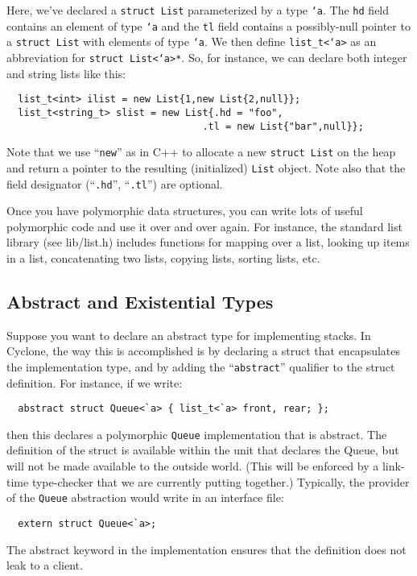 Here, we've declared a \texttt{struct List} parameterized by a type
\texttt{`a}.  The \texttt{hd} field contains an element of type \texttt{`a}
and the \texttt{tl} field contains a possibly-null pointer to a
\texttt{struct List} with elements of type \texttt{`a}.  We then define
\texttt{list_t<`a>} as an abbreviation for \texttt{struct List<`a>*}.  So,
for instance, we can declare both integer and string lists like this:
\begin{verbatim}
  list_t<int> ilist = new List{1,new List{2,null}};
  list_t<string_t> slist = new List{.hd = "foo",
                                  .tl = new List{"bar",null}};
\end{verbatim}

Note that we use ``\texttt{new}'' as in C++ to allocate a new
\texttt{struct List} on the heap and return a pointer to the resulting
(initialized) \texttt{List} object.  Note also that the field designator
(``\texttt{.hd}'', ``\texttt{.tl}'') are optional.

Once you have polymorphic data structures, you can write lots of
useful polymorphic code and use it over and over again.  For instance,
the standard list library (see lib/list.h) includes functions for
mapping over a list, looking up items in a list, concatenating two
lists, copying lists, sorting lists, etc.

\subsection{Abstract and Existential Types}
Suppose you want to declare an abstract type for implementing stacks.
In Cyclone, the way this is accomplished is by declaring a struct that
encapsulates the implementation type, and by adding the
``\texttt{abstract}'' qualifier to the struct definition.  For instance,
if we write:
\begin{verbatim}
  abstract struct Queue<`a> { list_t<`a> front, rear; };
\end{verbatim}
then this declares a polymorphic \texttt{Queue} implementation that is
abstract.  The definition of the struct is available within the unit
that declares the Queue, but will not be made available to the outside
world.  (This will be enforced by a link-time type-checker that we
are currently putting together.)  Typically, the provider of the
\texttt{Queue} abstraction would write in an interface file:
\begin{verbatim}
  extern struct Queue<`a>;
\end{verbatim}
The abstract keyword in the implementation ensures that the definition
does not leak to a client.  

